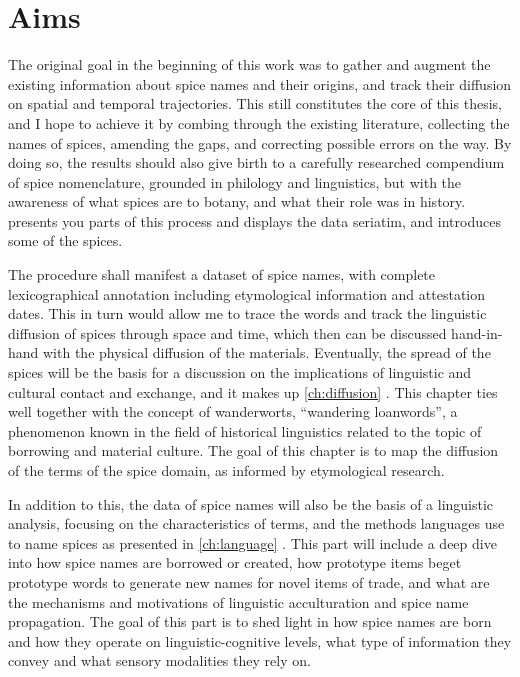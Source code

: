 \section{Aims}

The original goal in the beginning of this work was to gather and augment the existing information about spice names and their origins, and track their diffusion on spatial and temporal trajectories. This still constitutes the core of this thesis, and I hope to achieve it by combing through the existing literature, collecting the names of spices, amending the gaps, and correcting possible errors on the way. By doing so, the results should also give birth to a carefully researched compendium of spice nomenclature, grounded in philology and linguistics, but with the awareness of what spices are to botany, and what their role was in history.   presents you parts of this process and displays the data seriatim, and introduces some of the spices.

The procedure shall manifest a dataset of spice names, with complete lexicographical annotation including etymological information and attestation dates. This in turn would allow me to trace the words and track the linguistic diffusion of spices through space and time, which then can be discussed hand-in-hand with the physical diffusion of the materials. Eventually, the spread of the spices will be the basis for a discussion on the implications of linguistic and cultural contact and exchange, and it makes up \cref{ch:diffusion} . This chapter ties well together with the concept of \glspl{wanderwort}, ``wandering loanwords'', a phenomenon known in the field of historical linguistics related to the topic of borrowing and material culture. The goal of this chapter is to map the diffusion of the terms of the spice domain, as informed by etymological research.

In addition to this, the data of spice names will also be the basis of a linguistic analysis, focusing on the characteristics of terms, and the methods languages use to name spices as presented in \cref{ch:language} . This part will include a deep dive into how spice names are borrowed or created, how prototype items beget prototype words to generate new names for novel items of trade, and what are the mechanisms and motivations of linguistic acculturation and spice name propagation. The goal of this part is to shed light in how spice names are born and how they operate on linguistic-cognitive levels, what type of information they convey and what sensory modalities they rely on.

